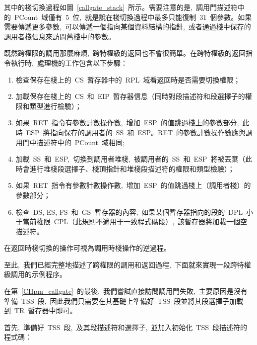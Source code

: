 
其中的棧切換過程如圖~\ref{callgate_stack}~所示。需要注意的是,~調用門描述符中的~PCount~域僅有~5~位,~就是說在棧切換過程中最多只能復制~31~個參數。如果需要傳遞更多參數,~可以傳遞一個指向某個資料結構的指針,~或者通過棧中保存的調用者棧信息來訪問舊棧中的參數。

既然跨權限的調用那麼麻煩,~跨特權級的返回也不會很簡單。在跨特權級的返回指令執行時,~處理機的工作包含以下步驟：

\begin{enumerate}
\item 檢查保存在棧上的~CS~暫存器中的~RPL~域看返回時是否需要切換權限；
\item 加載保存在棧上的~CS~和~EIP~暫存器信息（同時對段描述符和段選擇子的權限和類型進行檢驗）；
\item 如果~RET~指令有參數計數操作數,~增加~ESP~的值跳過棧上的參數部分,~此時~ESP~將指向保存的調用者的~SS~和~ESP。RET~的參數計數操作數應與調用門中描述符中的~PCount~域相同;
\item 加載~SS~和~ESP,~切換到調用者堆棧,~被調用者的~SS~和~ESP~將被丟棄（此時會進行堆棧段選擇子、棧頂指針和堆棧段描述符的權限和類型檢驗）；
\item 如果~RET~指令有參數計數操作數,~增加~ESP~的值跳過棧上（調用者棧）的參數部分；
\item 檢查~DS, ES, FS~和~GS~暫存器的內容,~如果某個暫存器指向的段的~DPL~小于當前權限~CPL（此規則不適用于一致程式碼段）,~該暫存器將加載一個空描述符。
\end{enumerate}

在返回時棧切換的操作可視為調用時棧操作的逆過程。

至此,~我們已經完整地描述了跨權限的調用和返回過程,~下面就來實現一段跨特權級調用的示例程序。

在第~\ref{CHpm_callgate}~的最後,~我們嘗試直接訪問調用門失敗,~主要原因是沒有準備~TSS~段,~因此我們只需要在其基礎上準備好~TSS~段並將其段選擇子加載到~TR~暫存器中即可。

首先,~準備好~TSS~段,~及其段描述符和選擇子,~並加入初始化~TSS~段描述符的程式碼：

\label{CHpm_tss_desc}

